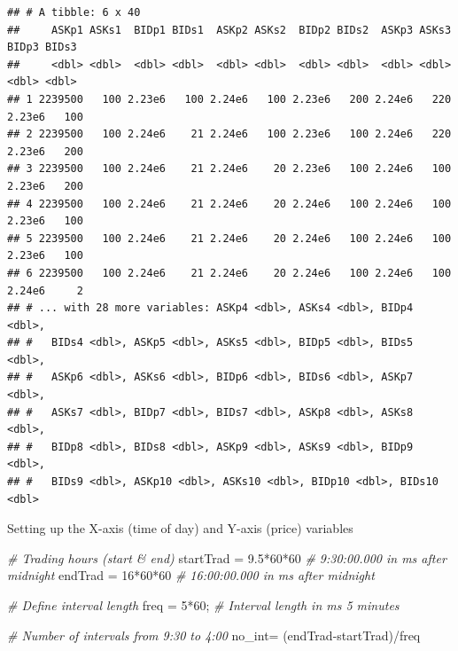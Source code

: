 \documentclass[
  oneside]{book}
\newenvironment{Shaded}{\begin{snugshade}}{\end{snugshade}}
\newcommand{\CommentTok}[1]{\textcolor[rgb]{0.56,0.35,0.01}{\textit{#1}}}
\newcommand{\DecValTok}[1]{\textcolor[rgb]{0.00,0.00,0.81}{#1}}
\newcommand{\FloatTok}[1]{\textcolor[rgb]{0.00,0.00,0.81}{#1}}
\newcommand{\NormalTok}[1]{#1}
\newcommand{\OtherTok}[1]{\textcolor[rgb]{0.56,0.35,0.01}{#1}}
\newcommand{\SpecialCharTok}[1]{\textcolor[rgb]{0.00,0.00,0.00}{#1}}
\begin{document}
\begin{verbatim}
## # A tibble: 6 x 40
##     ASKp1 ASKs1  BIDp1 BIDs1  ASKp2 ASKs2  BIDp2 BIDs2  ASKp3 ASKs3  BIDp3 BIDs3
##     <dbl> <dbl>  <dbl> <dbl>  <dbl> <dbl>  <dbl> <dbl>  <dbl> <dbl>  <dbl> <dbl>
## 1 2239500   100 2.23e6   100 2.24e6   100 2.23e6   200 2.24e6   220 2.23e6   100
## 2 2239500   100 2.24e6    21 2.24e6   100 2.23e6   100 2.24e6   220 2.23e6   200
## 3 2239500   100 2.24e6    21 2.24e6    20 2.23e6   100 2.24e6   100 2.23e6   200
## 4 2239500   100 2.24e6    21 2.24e6    20 2.24e6   100 2.24e6   100 2.23e6   100
## 5 2239500   100 2.24e6    21 2.24e6    20 2.24e6   100 2.24e6   100 2.23e6   100
## 6 2239500   100 2.24e6    21 2.24e6    20 2.24e6   100 2.24e6   100 2.24e6     2
## # ... with 28 more variables: ASKp4 <dbl>, ASKs4 <dbl>, BIDp4 <dbl>,
## #   BIDs4 <dbl>, ASKp5 <dbl>, ASKs5 <dbl>, BIDp5 <dbl>, BIDs5 <dbl>,
## #   ASKp6 <dbl>, ASKs6 <dbl>, BIDp6 <dbl>, BIDs6 <dbl>, ASKp7 <dbl>,
## #   ASKs7 <dbl>, BIDp7 <dbl>, BIDs7 <dbl>, ASKp8 <dbl>, ASKs8 <dbl>,
## #   BIDp8 <dbl>, BIDs8 <dbl>, ASKp9 <dbl>, ASKs9 <dbl>, BIDp9 <dbl>,
## #   BIDs9 <dbl>, ASKp10 <dbl>, ASKs10 <dbl>, BIDp10 <dbl>, BIDs10 <dbl>
\end{verbatim}

Setting up the X-axis (time of day) and Y-axis (price) variables

\begin{Shaded}
\begin{Highlighting}[]
\CommentTok{\# Trading hours (start \& end)}
\NormalTok{startTrad }\OtherTok{=} \FloatTok{9.5}\SpecialCharTok{*}\DecValTok{60}\SpecialCharTok{*}\DecValTok{60}       \CommentTok{\# 9:30:00.000 in ms after midnight}
\NormalTok{endTrad }\OtherTok{=} \DecValTok{16}\SpecialCharTok{*}\DecValTok{60}\SpecialCharTok{*}\DecValTok{60}        \CommentTok{\# 16:00:00.000 in ms after midnight}

\CommentTok{\# Define interval length}
\NormalTok{freq }\OtherTok{=} \DecValTok{5}\SpecialCharTok{*}\DecValTok{60}\NormalTok{;   }\CommentTok{\# Interval length in ms 5 minutes}

\CommentTok{\# Number of intervals from 9:30 to 4:00}
\NormalTok{no\_int}\OtherTok{=}\NormalTok{ (endTrad}\SpecialCharTok{{-}}\NormalTok{startTrad)}\SpecialCharTok{/}\NormalTok{freq}
\end{Highlighting}
\end{Shaded}
\end{document}
